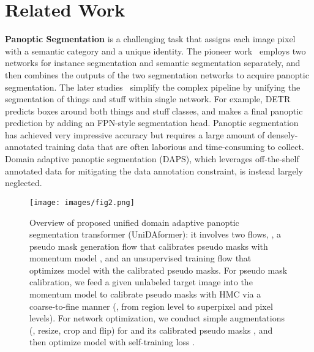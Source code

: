 \documentclass[10pt,twocolumn,letterpaper]{article}
\begin{document}
\section{Related Work}


\textbf{Panoptic Segmentation} is a challenging task that assigns each image pixel with a semantic category and a unique identity.
The pioneer work~\cite{kirillov2019panoptic} employs two networks for instance segmentation and semantic segmentation separately, and then combines the outputs of the two segmentation networks to acquire panoptic segmentation.
The later studies~\cite{xiong2019upsnet,kirillov2019panopticfpn,li2019aunet,carion2020detr,cheng2020panoptic,li2021fullypanoptic,wang2021maxdeeplab,cheng2021maskformer,cheng2021masked} simplify the complex pipeline by unifying the segmentation of things and stuff within single network.
For example, DETR~\cite{carion2020detr} predicts boxes around both things and stuff classes, and makes a final panoptic prediction by adding an FPN-style segmentation head.
Panoptic segmentation has achieved very impressive accuracy but requires a large amount of densely-annotated training data that are often laborious and time-consuming to collect. Domain adaptive panoptic segmentation (DAPS), which leverages off-the-shelf annotated data for mitigating the data annotation constraint, is instead largely neglected.

\begin{figure*}[t]
\centering
\texttt{[image: images/fig2.png]}
\caption{
Overview of proposed unified domain adaptive panoptic segmentation transformer (UniDAformer):
it involves two flows, , a pseudo mask generation flow that calibrates pseudo masks with momentum model , and an unsupervised training flow that optimizes model  with the calibrated pseudo masks.
For pseudo mask calibration, we feed a given unlabeled target image  into the momentum model  to calibrate pseudo masks  with HMC via a coarse-to-fine manner (, from region level to superpixel and pixel levels).
For network optimization, we conduct simple augmentations (, resize, crop and flip) for  and its calibrated pseudo masks , and then optimize model  with self-training loss .
}
\label{fig:stru}
\end{figure*}
\end{document}
